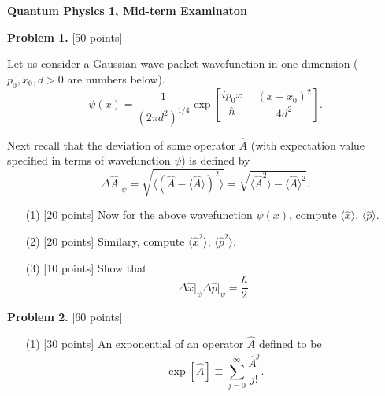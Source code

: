 \documentclass[11pt]{article}
\begin{document}
\thispagestyle{empty}

\begin{center}
    \Large\textbf{Quantum Physics 1, Mid-term Examinaton}

\vspace{1cm}
\normalsize
{}

\vspace{0.5cm}
\end{center}

\textbf{Problem 1.} [50 points]

Let us consider a Gaussian wave-packet wavefunction in one-dimension ($p_0,x_0,d>0$ are numbers below).
\begin{equation*}
    \psi (x) = \frac{1}{(2 \pi d^2 ) ^{1/4}} \exp{\left[ \frac{ip_0 x}{\hbar} - \frac{(x-x_0)^2}{4d^2} \right].}
\end{equation*}

Next recall that the deviation of some operator $\hat{A}$ (with expectation value specified in terms of wavefunction $\psi$) is defined by
\begin{equation*}
    \Delta \hat{A} \big|_{\psi} = \sqrt{ \langle ( \hat{A} - \langle \hat{A} \rangle )^2 \rangle } = \sqrt{ \langle \hat{A}^2 \rangle - \langle \hat{A} \rangle^2 }.
\end{equation*}

\begin{enumerate}[leftmargin=3.5em,itemsep=-3pt]
    \item[(1)] [20 points] Now for the above wavefunction $\psi (x)$, compute $\langle \hat{x} \rangle$, $\langle \hat{p} \rangle$.
    \item[(2)] [20 points] Similary, compute $\langle \hat{x}^2 \rangle$, $\langle \hat{p}^2 \rangle$.
    \item[(3)] [10 points] Show that
    \begin{equation*}
        \Delta \hat{x} \big|_{\psi} \Delta \hat{p} \big|_{\psi} = \frac{\hbar}{2}.
    \end{equation*}
\end{enumerate}

\textbf{Problem 2.} [60 points]

\vspace{-4mm}
\begin{enumerate}[leftmargin=3.5em,itemsep=-3pt]
    \item[(1)] [30 points] An exponential of an operator $\hat{A}$ defined to be
    \begin{equation*}
        \exp[\hat{A}] \equiv \sum_{j=0}^{\infty} \frac{\hat{A}^j}{j!}.
    \end{equation*}
\end{enumerate} 
\end{document}

